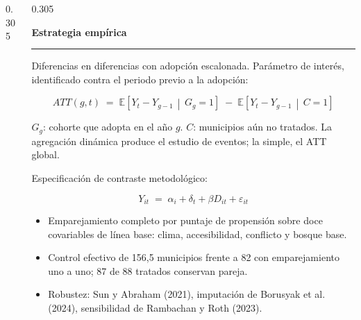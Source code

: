 \documentclass[final,t]{beamer}
\newcommand{\seccion}[2]{%
  \par\vspace{0.5\baselineskip}%
  {\color{dosel}\Large\bfseries #1\hfill{\color{tenue}\normalsize\mdseries #2}}\par
  \vspace{-0.35\baselineskip}%
  {\color{dosel}\rule{\linewidth}{2.2pt}}\par
  \vspace{0.25\baselineskip}%
}
\newcommand{\nota}[1]{{\color{tenue}\small #1\par}}
\begin{document}
\begin{frame}[t]{}
\begin{columns}[t]
\begin{column}{0.305\paperwidth}
\end{column}

\begin{column}{0.305\paperwidth}
\justifying

\seccion{Estrategia empírica}{}
\nota{Diferencias en diferencias con adopción escalonada. Parámetro de interés, identificado
contra el periodo previo a la adopción:}
\begin{tcolorbox}[colback=cajafondo,colframe=regla,boxrule=0.8pt,sharp corners]
\centering
\[
  ATT(g,t) \;=\; \mathbb{E}\!\left[Y_{t}-Y_{g-1}\,\middle|\,G_{g}=1\right]
               \;-\; \mathbb{E}\!\left[Y_{t}-Y_{g-1}\,\middle|\,C=1\right]
\]
\raggedright\nota{$G_g$: cohorte que adopta en el año $g$. $C$: municipios aún no tratados.
La agregación dinámica produce el estudio de eventos; la simple, el ATT global.}
\end{tcolorbox}

\nota{Especificación de contraste metodológico:}
\begin{tcolorbox}[colback=cajafondo,colframe=regla,boxrule=0.8pt,sharp corners]
\centering
\[
  Y_{it} \;=\; \alpha_i + \delta_t + \beta D_{it} + \varepsilon_{it}
\]
\end{tcolorbox}

\begin{itemize}
  \item Emparejamiento completo por puntaje de propensión sobre doce covariables
        de línea base: clima, accesibilidad, conflicto y bosque base.
  \item Control efectivo de 156,5 municipios frente a 82 con emparejamiento uno a uno;
        87 de 88 tratados conservan pareja.
  \item Robustez: Sun y Abraham (2021), imputación de Borusyak et al. (2024),
        sensibilidad de Rambachan y Roth (2023).
\end{itemize}


\end{column}
\end{columns}
\end{frame}
\end{document}
